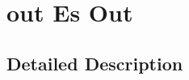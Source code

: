 \hypertarget{group__es}{}\section{out Es Out}
\label{group__es}


\subsection{Detailed Description}
